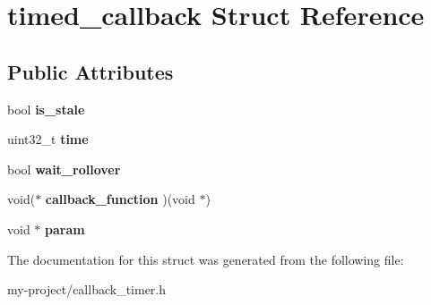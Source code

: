 \hypertarget{structtimed__callback}{}\section{timed\+\_\+callback Struct Reference}
\label{structtimed__callback}
\subsection*{Public Attributes}
\begin{DoxyCompactItemize}
\item 
\mbox{\label{structtimed__callback_a8a989a7d0b2b34ba38a88511a933ee03}} 
bool {\bfseries is\+\_\+stale}
\item 
\mbox{\label{structtimed__callback_a08b860802165ecd9bdefeececae084f3}} 
uint32\+\_\+t {\bfseries time}
\item 
\mbox{\label{structtimed__callback_a54c4400af5b122f38fde93b722917138}} 
bool {\bfseries wait\+\_\+rollover}
\item 
\mbox{\label{structtimed__callback_ad24f7bce59a382a22ae7764df09afe78}} 
void($\ast$ {\bfseries callback\+\_\+function} )(void $\ast$)
\item 
\mbox{\label{structtimed__callback_a7437f4557214bb9ab83ac1d102f929b6}} 
void $\ast$ {\bfseries param}
\end{DoxyCompactItemize}


The documentation for this struct was generated from the following file\+:\begin{DoxyCompactItemize}
\item 
my-\/project/callback\+\_\+timer.\+h\end{DoxyCompactItemize}
